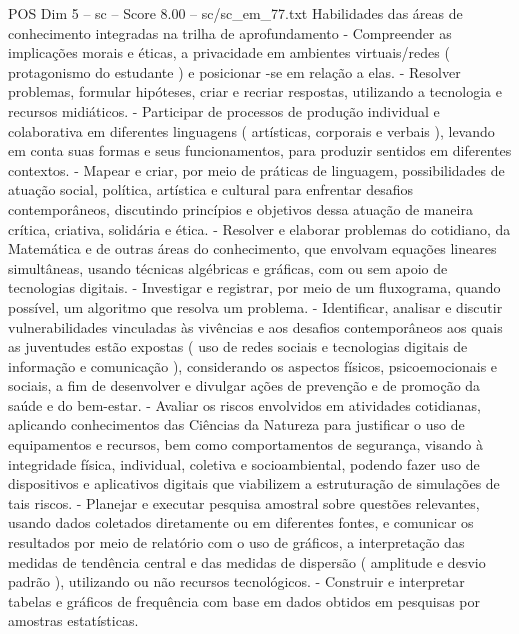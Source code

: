 \begin{textsample}{POS Dim 5 – sc – Score 8.00 – sc/sc\_em\_77.txt}
Habilidades das áreas de conhecimento integradas na trilha de aprofundamento - Compreender as implicações morais e éticas, a privacidade em ambientes virtuais/redes ( protagonismo do estudante ) e posicionar -se em relação a elas. - Resolver problemas, formular hipóteses, criar e recriar respostas, utilizando a tecnologia e recursos midiáticos. - Participar de processos de produção individual e colaborativa em diferentes linguagens ( artísticas, corporais e verbais ), levando em conta suas formas e seus funcionamentos, para produzir sentidos em diferentes contextos. - Mapear e criar, por meio de práticas de linguagem, possibilidades de atuação social, política, artística e cultural para enfrentar desafios contemporâneos, discutindo princípios e objetivos dessa atuação de maneira crítica, criativa, solidária e ética. - Resolver e elaborar problemas do cotidiano, da Matemática e de outras áreas do conhecimento, que envolvam equações lineares simultâneas, usando técnicas algébricas e gráficas, com ou sem apoio de tecnologias digitais. - Investigar e registrar, por meio de um fluxograma, quando possível, um algoritmo que resolva um problema. - Identificar, analisar e discutir vulnerabilidades vinculadas às vivências e aos desafios contemporâneos aos quais as juventudes estão expostas ( uso de redes sociais e tecnologias digitais de informação e comunicação ), considerando os aspectos físicos, psicoemocionais e sociais, a fim de desenvolver e divulgar ações de prevenção e de promoção da saúde e do bem-estar. - Avaliar os riscos envolvidos em atividades cotidianas, aplicando conhecimentos das Ciências da Natureza para justificar o uso de equipamentos e recursos, bem como comportamentos de segurança, visando à integridade física, individual, coletiva e socioambiental, podendo fazer uso de dispositivos e aplicativos digitais que viabilizem a estruturação de simulações de tais riscos. - Planejar e executar pesquisa amostral sobre questões relevantes, usando dados coletados diretamente ou em diferentes fontes, e comunicar os resultados por meio de relatório com o uso de gráficos, a interpretação das medidas de tendência central e das medidas de dispersão ( amplitude e desvio padrão ), utilizando ou não recursos tecnológicos. - Construir e interpretar tabelas e gráficos de frequência com base em dados obtidos em pesquisas por amostras estatísticas.

\end{textsample}
